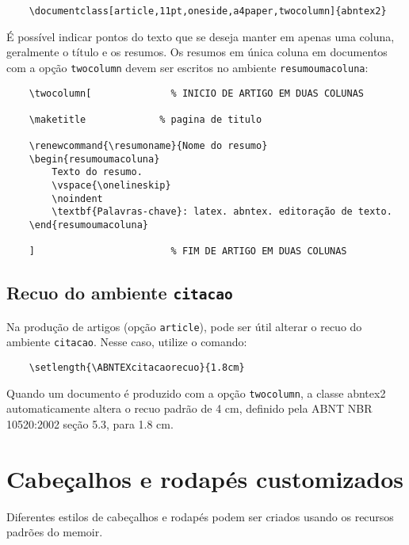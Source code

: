 \documentclass[
	article,			
	11pt,				
	oneside,			
	a4paper,			
	english,			
	brazil,				
	sumario=tradicional
	]{abntex2}
\begin{document}
\begin{verbatim}
    \documentclass[article,11pt,oneside,a4paper,twocolumn]{abntex2}
\end{verbatim}

É possível indicar pontos do texto que se deseja manter em apenas uma coluna,
geralmente o título e os resumos. Os resumos em única coluna em documentos com
a opção \texttt{twocolumn} devem ser escritos no ambiente
\texttt{resumoumacoluna}:

\begin{verbatim}
    \twocolumn[              % INICIO DE ARTIGO EM DUAS COLUNAS

    \maketitle             % pagina de titulo

    \renewcommand{\resumoname}{Nome do resumo}
    \begin{resumoumacoluna}
        Texto do resumo.
        \vspace{\onelineskip}
        \noindent
        \textbf{Palavras-chave}: latex. abntex. editoração de texto.
    \end{resumoumacoluna}

    ]                        % FIM DE ARTIGO EM DUAS COLUNAS
\end{verbatim}

\subsection{Recuo do ambiente \texttt{citacao}}

Na produção de artigos (opção \texttt{article}), pode ser útil alterar o recuo
do ambiente \texttt{citacao}. Nesse caso, utilize o comando:

\begin{verbatim}
    \setlength{\ABNTEXcitacaorecuo}{1.8cm}
\end{verbatim}

Quando um documento é produzido com a opção \texttt{twocolumn}, a classe
\textsf{abntex2} automaticamente altera o recuo padrão de 4 cm, definido pela
ABNT NBR 10520:2002 seção 5.3, para 1.8 cm.

\section{Cabeçalhos e rodapés customizados}

Diferentes estilos de cabeçalhos e rodapés podem ser criados usando os
recursos padrões do \textsf{memoir}.
\end{document}
